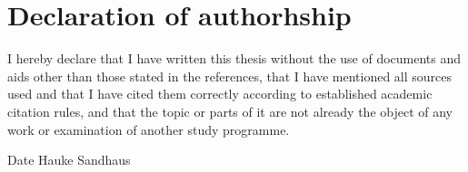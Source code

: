 \chapter*{Declaration of authorhship}
I hereby declare that I have written this thesis without the use of documents and aids other than those stated in the references, that I have mentioned all sources used and that I have cited them correctly according to established academic citation rules, and that the topic or parts of it are not already the object of any work or examination of another study programme.

\vspace{4cm}

Date \hspace{\fill} Hauke Sandhaus \\
